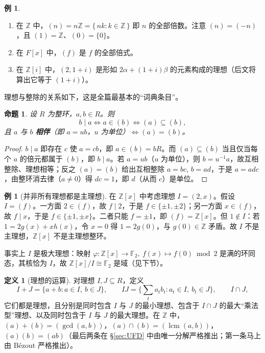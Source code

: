 \documentclass[a4paper,11pt]{ctexart}
\numberwithin{equation}{section}
\theoremstyle{plain}
\newtheorem{proposition}[theorem]{命题}
\theoremstyle{definition}
\newtheorem{definition}[theorem]{定义}
\newtheorem{example}[theorem]{例}
\theoremstyle{remark}
\newcommand{\Z}{\mathbb{Z}}
\newcommand{\F}{\mathbb{F}}
\DeclareMathOperator{\lcm}{lcm}
\newcommand{\Ga}{\mathbb{Z}[i]}
\begin{document}
\begin{example}\label{ex:ideals}
\begin{enumerate}[itemsep=0.1em]
  \item 在 $\Z$ 中，$(n)=n\Z=\{\,nk : k\in\Z\,\}$ 即 $n$ 的全部倍数。注意 $(n)=(-n)$，且 $(1)=\Z$、$(0)=\{0\}$。
  \item 在 $F[x]$ 中，$(f)$ 是 $f$ 的全部倍式。
  \item 在 $\Ga$ 中，$(2,1+i)$ 是形如 $2\alpha+(1+i)\beta$ 的元素构成的理想（后文将算出它等于 $(1+i)$）。
\end{enumerate}
\end{example}

理想与整除的关系如下，这是全篇最基本的“词典条目”。

\begin{proposition}\label{prop:divideal}
设 $R$ 为整环，$a,b\in R$。则
\[
b\mid a \iff a\in (b) \iff (a)\subseteq (b),
\]
且 $a$ 与 $b$ \textbf{相伴}（即 $a=ub$，$u$ 为单位）$\iff (a)=(b)$。
\end{proposition}

\begin{proof}
$b\mid a$ 即存在 $c$ 使 $a=cb$，即 $a\in(b)=bR$。而 $(a)\subseteq(b)$ 当且仅当每个 $a$ 的倍元都属于 $(b)$，即 $b\mid a$。若 $a=ub$（$u$ 为单位），则 $b=u^{-1}a$，故互相整除、理想相等；反之 $(a)=(b)$ 给出互相整除 $a=bc$, $b=ad$，于是 $a=adc$，由整环消去律（$a\neq 0$）得 $dc=1$，即 $d$（从而 $c$）是单位。
\end{proof}

\begin{example}[并非所有理想都是主理想]\label{ex:2xideal}
在 $\Z[x]$ 中考虑理想 $I=(2,x)$。假设 $I=(f)$。一方面 $2\in(f)$，故 $f\mid 2$，于是 $f\in\{\pm1,\pm2\}$；另一方面 $x\in (f)$，故 $f \mid x$，于是 $f\in\{\pm1,\pm x\}$。二者只能 $f=\pm1$，即 $(f)=\Z[x]$。但 $1\notin I$：若 $1=2g(x)+xh(x)$，令 $x=0$ 得 $1=2g(0)$，与 $g(0)\in\Z$ 矛盾。故 $I$ 不是主理想，$\Z[x]$ 不是主理想整环。

事实上 $I$ 是极大理想：映射 $\varphi\colon \Z[x]\to\F_2,\ f(x)\mapsto f(0)\bmod 2$ 是满的环同态，其核恰为 $I$，故 $\Z[x]/I\cong \F_2$ 是域（见下节）。
\end{example}

\begin{definition}[理想的运算]\label{def:idealops}
对理想 $I,J\subseteq R$，定义
\[
I+J=\{a+b : a\in I,\ b\in J\},\qquad
IJ=\Big\{\sum_{t} a_t b_t : a_t\in I,\ b_t\in J\Big\},\qquad
I\cap J,
\]
它们都是理想，且分别是同时包含 $I$ 与 $J$ 的最小理想、包含于 $I\cap J$ 的最大“乘法型”理想、以及同时包含于 $I$ 与 $J$ 的最大理想。在 $\Z$ 中，$(a)+(b)=(\gcd(a,b))$，$(a)\cap(b)=(\lcm(a,b))$，$(a)(b)=(ab)$（最后两条在 \S\ref{sec:UFD} 中由唯一分解严格推出；第一条马上由 Bézout 严格推出）。
\end{definition}
\end{document}
